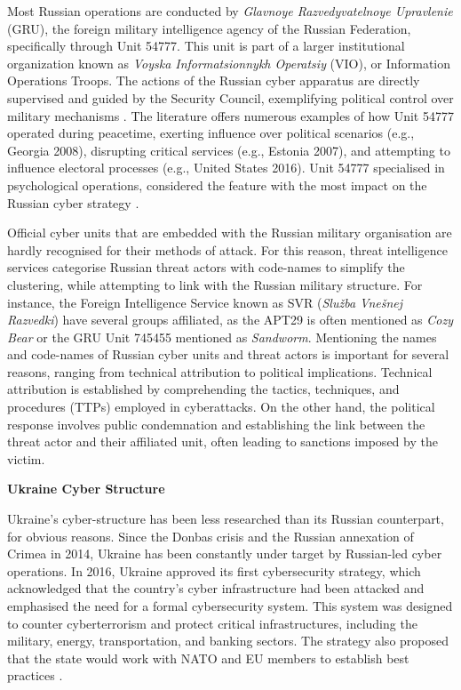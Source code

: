 Most Russian operations are conducted by \textit{Glavnoye Razvedyvatelnoye Upravlenie} (GRU), the foreign military intelligence agency of the Russian Federation, specifically through Unit 54777. This unit is part of a larger institutional organization known as \textit{Voyska Informatsionnykh Operatsiy} (VIO), or Information Operations Troops. The actions of the Russian cyber apparatus are directly supervised and guided by the Security Council, exemplifying political control over military mechanisms \autocite{wilde_2022_cyber}. The literature offers numerous examples of how Unit 54777 operated during peacetime, exerting influence over political scenarios (e.g., Georgia 2008), disrupting critical services (e.g., Estonia 2007), and attempting to influence electoral processes (e.g., United States 2016). Unit 54777 specialised in psychological operations, considered the feature with the most impact on the Russian cyber strategy \autocite{wilde_2022_cyber}.

Official cyber units that are embedded with the Russian military organisation are hardly recognised for their methods of attack. For this reason, threat intelligence services categorise Russian threat actors with code-names to simplify the clustering, while attempting to link with the Russian military structure. For instance, the Foreign Intelligence Service known as SVR (\textit{Služba Vnešnej Razvedki}) have several groups affiliated, as the APT29 is often mentioned as \textit{Cozy Bear} or the GRU Unit 745455 mentioned as \textit{Sandworm}. Mentioning the names and code-names of Russian cyber units and threat actors is important for several reasons, ranging from technical attribution to political implications. Technical attribution is established by comprehending the tactics, techniques, and procedures (TTPs) employed in cyberattacks. On the other hand, the political response involves public condemnation and establishing the link between the threat actor and their affiliated unit, often leading to sanctions imposed by the victim.

\textbf{Ukraine Cyber Structure}

Ukraine's cyber-structure has been less researched than its Russian counterpart, for obvious reasons. Since the Donbas crisis and the Russian annexation of Crimea in 2014, Ukraine has been constantly under target by Russian-led cyber operations. In 2016, Ukraine approved its first cybersecurity strategy, which acknowledged that the country's cyber infrastructure had been attacked and emphasised the need for a formal cybersecurity system. This system was designed to counter cyberterrorism and protect critical infrastructures, including the military, energy, transportation, and banking sectors. The strategy also proposed that the state would work with NATO and EU members to establish best practices \autocite{brantly_2019_cybersecurity}.

